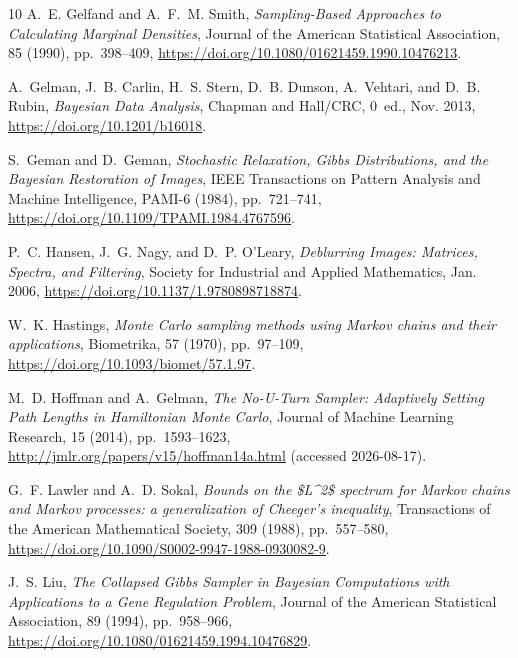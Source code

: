 \documentclass[onefignum,onetabnum]{siamonline250211}
\begin{document}
\begin{thebibliography}{10}
{\sc A.~E. Gelfand and A.~F.~M. Smith}, {\em Sampling-{Based} {Approaches} to
  {Calculating} {Marginal} {Densities}}, Journal of the American Statistical
  Association, 85 (1990), pp.~398--409,
  \url{https://doi.org/10.1080/01621459.1990.10476213}.

{\sc A.~Gelman, J.~B. Carlin, H.~S. Stern, D.~B. Dunson, A.~Vehtari, and D.~B.
  Rubin}, {\em Bayesian {Data} {Analysis}}, Chapman and Hall/CRC, 0~ed., Nov.
  2013, \url{https://doi.org/10.1201/b16018}.

{\sc S.~Geman and D.~Geman}, {\em Stochastic {Relaxation}, {Gibbs}
  {Distributions}, and the {Bayesian} {Restoration} of {Images}}, IEEE
  Transactions on Pattern Analysis and Machine Intelligence, PAMI-6 (1984),
  pp.~721--741, \url{https://doi.org/10.1109/TPAMI.1984.4767596}.

{\sc P.~C. Hansen, J.~G. Nagy, and D.~P. O'Leary}, {\em Deblurring {Images}:
  {Matrices}, {Spectra}, and {Filtering}}, Society for Industrial and Applied
  Mathematics, Jan. 2006, \url{https://doi.org/10.1137/1.9780898718874}.

{\sc W.~K. Hastings}, {\em Monte {Carlo} sampling methods using {Markov} chains
  and their applications}, Biometrika, 57 (1970), pp.~97--109,
  \url{https://doi.org/10.1093/biomet/57.1.97}.

{\sc M.~D. Hoffman and A.~Gelman}, {\em The {No}-{U}-{Turn} {Sampler}:
  {Adaptively} {Setting} {Path} {Lengths} in {Hamiltonian} {Monte} {Carlo}},
  Journal of Machine Learning Research, 15 (2014), pp.~1593--1623,
  \url{http://jmlr.org/papers/v15/hoffman14a.html} (accessed 2026-08-17).

{\sc G.~F. Lawler and A.~D. Sokal}, {\em Bounds on the
  \${L}{\textasciicircum}2\$ spectrum for {Markov} chains and {Markov}
  processes: a generalization of {Cheeger}’s inequality}, Transactions of the
  American Mathematical Society, 309 (1988), pp.~557--580,
  \url{https://doi.org/10.1090/S0002-9947-1988-0930082-9}.

{\sc J.~S. Liu}, {\em The {Collapsed} {Gibbs} {Sampler} in {Bayesian}
  {Computations} with {Applications} to a {Gene} {Regulation} {Problem}},
  Journal of the American Statistical Association, 89 (1994), pp.~958--966,
  \url{https://doi.org/10.1080/01621459.1994.10476829}.


\end{thebibliography}
\end{document}
